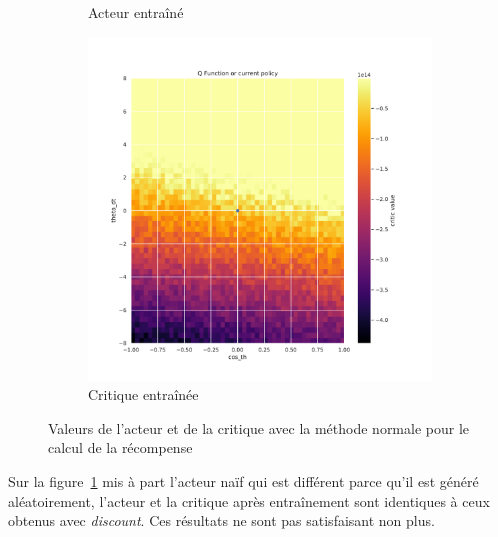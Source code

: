 \begin{figure}[H]
\begin{subfigure}{0.3\textwidth}
        \caption{Acteur entraîné}
    \end{subfigure}
    \begin{subfigure}{0.3\textwidth}
        \includegraphics[width=\textwidth]{figures/iteration1/0_critic_normalize_post_Pendulum-v0.pdf}
        \caption{Critique entraînée}
    \end{subfigure}
    \caption{Valeurs de l'acteur et de la critique avec la méthode normale pour le calcul de la récompense}
    \label{fig:attempt1_normalize}
\end{figure}

Sur la figure~\ref{fig:attempt1_normalize} mis à part l'acteur naïf qui est différent parce qu'il est généré aléatoirement, l'acteur et la critique après entraînement sont identiques à ceux obtenus avec \emph{discount}. Ces résultats ne sont pas satisfaisant non plus.

